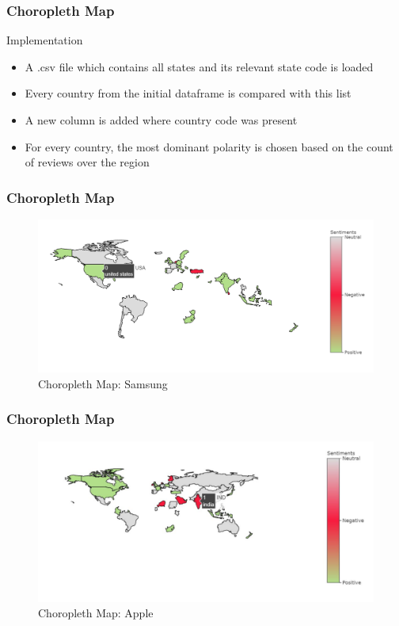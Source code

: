 \documentclass{beamer}
\begin{document}
\begin{frame}
\frametitle{Choropleth Map}
{\Large Implementation}
\begin{itemize}
\item A .csv file which contains all states and its relevant state code is loaded 
\item Every country from the initial dataframe is compared with this list
\item  A new column is added where country code was present
\item For every country, the most dominant polarity is chosen based on the count of reviews over the region
\end{itemize}
\end{frame}

\begin{frame}
\frametitle{Choropleth Map}
\begin{figure}
\includegraphics[scale=0.5]{samchoro}
\caption{Choropleth Map: Samsung}
\end{figure}
\end{frame}

\begin{frame}
\frametitle{Choropleth Map}
\begin{figure}
\includegraphics[scale=0.5]{aplchoro}
\caption{Choropleth Map: Apple}
\end{figure}
\end{frame}
\end{document}

